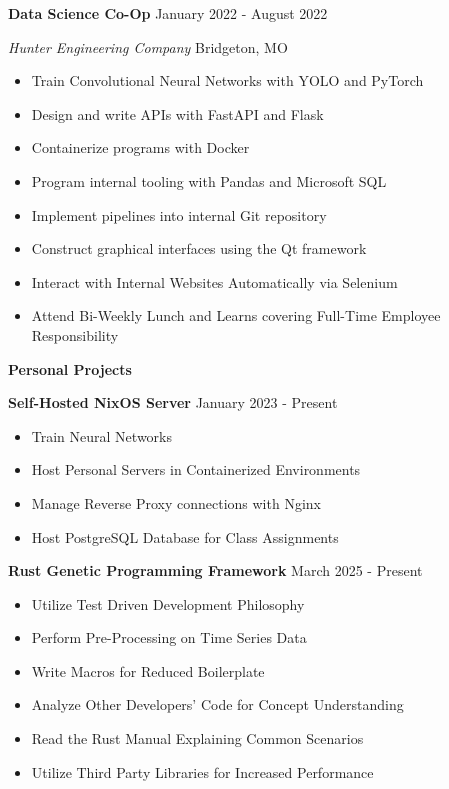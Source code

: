 \documentclass[11pt]{article}
\begin{document}

\textbf{Data Science Co-Op} \hfill January 2022 - August 2022

\textsl{Hunter Engineering Company} \hfill Bridgeton, MO
\begin{itemize}[noitemsep]
    \item Train Convolutional Neural Networks with YOLO and PyTorch
    \item Design and write APIs with FastAPI and Flask
    \item Containerize programs with Docker
    \item Program internal tooling with Pandas and Microsoft SQL
    \item Implement pipelines into internal Git repository
    \item Construct graphical interfaces using the Qt framework
    \item Interact with Internal Websites Automatically via Selenium
    \item Attend Bi-Weekly Lunch and Learns covering Full-Time Employee Responsibility
\end{itemize}


\begin{center}
    \textbf{Personal Projects}
\end{center}

\textbf{Self-Hosted NixOS Server} \hfill January 2023 - Present
\begin{itemize}[noitemsep]
    \item Train Neural Networks
    \item Host Personal Servers in Containerized Environments
    \item Manage Reverse Proxy connections with Nginx
    \item Host PostgreSQL Database for Class Assignments
\end{itemize}

\textbf{Rust Genetic Programming Framework} \hfill March 2025 - Present
\begin{itemize}[noitemsep]
    \item Utilize Test Driven Development Philosophy
    \item Perform Pre-Processing on Time Series Data
    \item Write Macros for Reduced Boilerplate
    \item Analyze Other Developers' Code for Concept Understanding
    \item Read the Rust Manual Explaining Common Scenarios
    \item Utilize Third Party Libraries for Increased Performance
\end{itemize}
\end{document}
